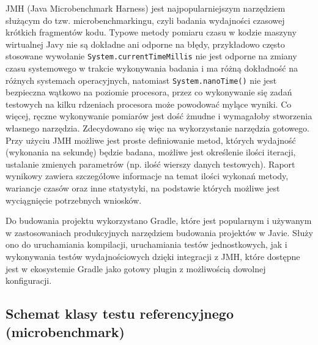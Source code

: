 \documentclass[12pt]{extarticle}
\begin{document}
    JMH (Java Microbenchmark Harness) jest najpopularniejszym narzędziem służącym do tzw. microbenchmarkingu, czyli badania wydajności czasowej krótkich fragmentów kodu. Typowe metody pomiaru czasu w kodzie maszyny wirtualnej Javy nie są dokładne ani odporne na błędy, przykładowo często stosowane wywołanie \texttt{System.currentTimeMillis} nie jest odporne na zmiany czasu systemowego w trakcie wykonywania badania i ma różną dokładność na różnych systemach operacyjnych, natomiast \texttt{System.nanoTime()} nie jest bezpieczna wątkowo na poziomie procesora, przez co wykonywanie się zadań testowych na kilku rdzeniach procesora może powodować mylące wyniki. Co więcej, ręczne wykonywanie pomiarów jest dość żmudne i wymagałoby stworzenia własnego narzędzia. Zdecydowano się więc na wykorzystanie narzędzia gotowego. Przy użyciu JMH możliwe jest proste definiowanie metod, których wydajność (wykonania na sekundę) będzie badana, możliwe jest określenie ilości iteracji, ustalanie zmienych parametrów (np. ilość wierszy danych testowych). Raport wynikowy zawiera szczegółowe informacje na temat ilości wykonań metody, wariancje czasów oraz inne statystyki, na podstawie których możliwe jest wyciągnięcie potrzebnych wniosków.

    Do budowania projektu wykorzystano Gradle, które jest popularnym i używanym w zastosowaniach produkcyjnych narzędziem budowania projektów w Javie. Służy ono do uruchamiania kompilacji, uruchamiania testów jednostkowych, jak i wykonywania testów wydajnościowych dzięki integracji z JMH, które dostępne jest w ekosystemie Gradle jako gotowy plugin z możliwością dowolnej konfiguracji.

\subsection{Schemat klasy testu referencyjnego (microbenchmark)}
\end{document}
